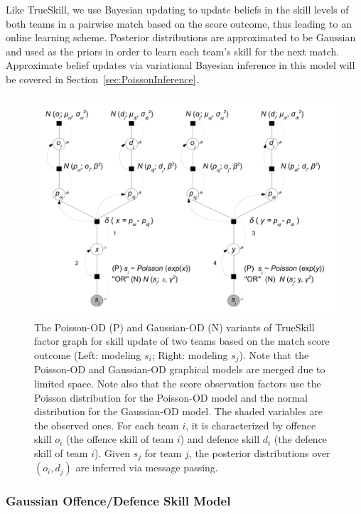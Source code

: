 \documentclass[runningheads,a4paper]{llncs}
\newcommand{\unindentmore}{\hspace{-1.5mm}}
\begin{document}
\unindentmore Like TrueSkill, we use Bayesian updating to update beliefs in the
skill levels of both teams in a pairwise match based on the score
outcome, thus leading to an online learning scheme.  Posterior
distributions are approximated to be Gaussian and used as the
priors in order to learn each team's skill for the next match.
Approximate belief updates via variational Bayesian inference in this model
will be covered in Section~\ref{sec:PoissonInference}.
%
\begin{figure}[t!]
\centerline{\includegraphics[scale=0.28]{modelAndInference}}
\caption{\small
The Poisson-OD (P) and Gaussian-OD (N) variants of TrueSkill factor graph for skill update of two teams based on the match score outcome (Left: modeling $s_i$; Right: modeling $s_j$). Note that the Poisson-OD and Gaussian-OD graphical models are merged due to limited space. Note also that the score observation factors use the Poisson distribution for the Poisson-OD model and the normal distribution for the Gaussian-OD model. The shaded variables are the observed ones. For each
team $i$, it is characterized by offence skill $o_{i}$ (the offence skill of team $i$) and defence skill $d_{i}$ (the defence skill of
team $i$). Given $s_j$ for team $j$, the posterior distributions over $(o_i,d_j)$ are inferred via message passing.
}
\label{fig:trueskill_variant}
\end{figure}

\subsubsection{Gaussian Offence/Defence Skill Model}
\end{document}
